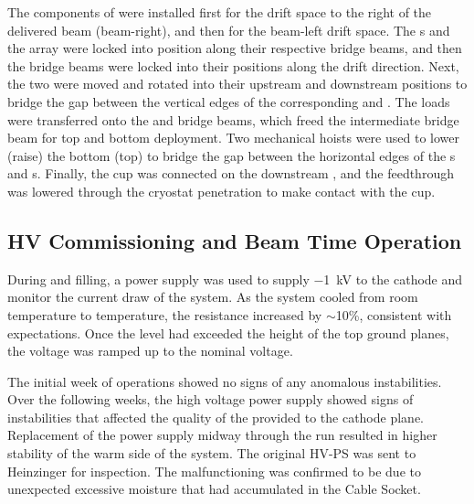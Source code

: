 The  components of  were installed first for the drift space to the right of the delivered beam (beam-right), and then for the beam-left drift space.
The s and the  array were locked into position along their respective bridge beams, and then the bridge beams were locked into their positions along the drift direction.
Next, the two  were moved and rotated into their upstream and downstream positions to bridge the gap between the vertical edges of the corresponding  and .
The  loads were transferred onto the  and   bridge beams, which freed the intermediate bridge beam for top and bottom  deployment.
Two mechanical hoists were used to lower (raise) the bottom (top)  to bridge the gap between the horizontal edges of the s and s.
Finally, the  cup was connected on the downstream , and the  feedthrough was lowered through the cryostat penetration to make contact with the cup.

\subsection{HV Commissioning and Beam Time Operation}
\label{sec:fdsp-hv-commissioning-operation}
During \cooldown and  filling, a power supply was used to supply $-$\SI{1}{kV} to the cathode and monitor the current draw of the system.
As the system cooled from room temperature to  temperature, the resistance increased by $\sim$10\%, consistent with expectations.
Once the  level had exceeded the height of the top ground planes, the voltage was ramped up to the nominal voltage.



The initial week of  operations showed no signs of any anomalous instabilities. Over the following weeks, the high voltage power supply showed signs of instabilities that affected the quality of the  provided to the cathode plane. Replacement of the power supply  midway through the run resulted in higher stability of the warm side of the  system. The original HV-PS was sent to Heinzinger for inspection. The malfunctioning was confirmed to be due to unexpected excessive moisture that had accumulated in the  Cable Socket.

